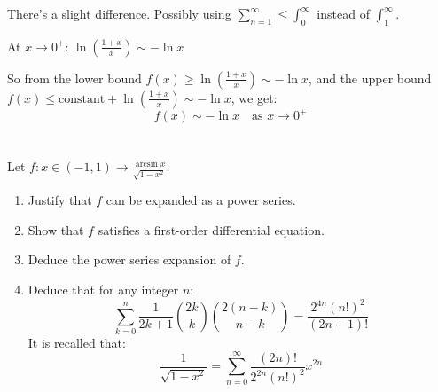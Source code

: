 \documentclass[12pt]{article}
\begin{document}
\begin{answerbox}
\begin{enumerate}
\begin{enumerate}
        There's a slight difference. Possibly using $\sum_{n=1}^\infty \leq \int_0^\infty$ instead of $\int_1^\infty$.
        
        At $x \to 0^+$: $\ln\left(\frac{1+x}{x}\right) \sim -\ln x$
        
        So from the lower bound $f(x) \geq \ln\left(\frac{1+x}{x}\right) \sim -\ln x$, and the upper bound $f(x) \leq \text{constant} + \ln\left(\frac{1+x}{x}\right) \sim -\ln x$, we get:
        \[
        f(x) \sim -\ln x \quad \text{as } x \to 0^+
        \]
    \end{enumerate}
\end{enumerate}
\end{answerbox}

\section{}
Let \( f : x \in (-1, 1) \longrightarrow \frac{\arcsin x}{\sqrt{1-x^2}} \).

\begin{enumerate}
    \item Justify that \( f \) can be expanded as a power series.
    
    \item Show that \( f \) satisfies a first-order differential equation.
    
    \item Deduce the power series expansion of \( f \).
    
    \item Deduce that for any integer \( n \):
    \[
    \sum_{k=0}^{n} \frac{1}{2k+1} \binom{2k}{k} \binom{2(n-k)}{n-k} = \frac{2^{4n}(n!)^2}{(2n+1)!}
    \]
    It is recalled that:
    \[
    \frac{1}{\sqrt{1-x^2}} = \sum_{n=0}^{\infty} \frac{(2n)!}{2^{2n}(n!)^2} x^{2n}
    \]
\end{enumerate}
\end{document}
